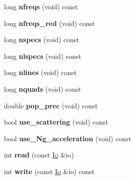 \begin{DoxyCompactItemize}
long {\bfseries nfreqs} (void) const
\item 
\mbox{\label{classParameters_aea06a149efe7e431720e09d9d8b0b70d}} 
long {\bfseries nfreqs\+\_\+red} (void) const
\item 
\mbox{\label{classParameters_aaaebc90313dd5c9cadfc5889f448b89b}} 
long {\bfseries nspecs} (void) const
\item 
\mbox{\label{classParameters_a8351d3b3fa555c59943ee27072612962}} 
long {\bfseries nlspecs} (void) const
\item 
\mbox{\label{classParameters_a13594666258a61680b3d77efcebf86c7}} 
long {\bfseries nlines} (void) const
\item 
\mbox{\label{classParameters_a4d7a96a332aa99994c08dc05d8895ff4}} 
long {\bfseries nquads} (void) const
\item 
\mbox{\label{classParameters_abef0cfc7dab680e9533f183bb3176a52}} 
double {\bfseries pop\+\_\+prec} (void) const
\item 
\mbox{\label{classParameters_aa04a263e330fc6a5197196c51aa20235}} 
bool {\bfseries use\+\_\+scattering} (void) const
\item 
\mbox{\label{classParameters_a5adb7b4e2485e753d0ece86ed52ba8f5}} 
bool {\bfseries use\+\_\+\+Ng\+\_\+acceleration} (void) const
\item 
\mbox{\label{classParameters_a3ed5e956a8c6778200ffc8eaf478c23c}} 
int {\bfseries read} (const \mbox{\hyperlink{structIo}{Io}} \&io)
\item 
\mbox{\label{classParameters_a6dee8e9f938079d64494e5b5f0eff16f}} 
int {\bfseries write} (const \mbox{\hyperlink{structIo}{Io}} \&io) const
\end{DoxyCompactItemize}
